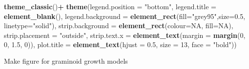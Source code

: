 \documentclass[
]{article}
\newenvironment{Shaded}{\begin{snugshade}}{\end{snugshade}}
\newcommand{\DataTypeTok}[1]{\textcolor[rgb]{0.13,0.29,0.53}{#1}}
\newcommand{\DecValTok}[1]{\textcolor[rgb]{0.00,0.00,0.81}{#1}}
\newcommand{\FloatTok}[1]{\textcolor[rgb]{0.00,0.00,0.81}{#1}}
\newcommand{\KeywordTok}[1]{\textcolor[rgb]{0.13,0.29,0.53}{\textbf{#1}}}
\newcommand{\NormalTok}[1]{#1}
\newcommand{\OperatorTok}[1]{\textcolor[rgb]{0.81,0.36,0.00}{\textbf{#1}}}
\newcommand{\OtherTok}[1]{\textcolor[rgb]{0.56,0.35,0.01}{#1}}
\newcommand{\StringTok}[1]{\textcolor[rgb]{0.31,0.60,0.02}{#1}}
\begin{document}
\begin{Shaded}
\begin{Highlighting}[]
\StringTok{  }\KeywordTok{theme\_classic}\NormalTok{()}\OperatorTok{+}
\StringTok{  }\KeywordTok{theme}\NormalTok{(}\DataTypeTok{legend.position =} \StringTok{"bottom"}\NormalTok{, }\DataTypeTok{legend.title =} \KeywordTok{element\_blank}\NormalTok{(), }\DataTypeTok{legend.background =} \KeywordTok{element\_rect}\NormalTok{(}\DataTypeTok{fill=}\StringTok{"grey95"}\NormalTok{,}\DataTypeTok{size=}\FloatTok{0.5}\NormalTok{, }\DataTypeTok{linetype=}\StringTok{"solid"}\NormalTok{), }\DataTypeTok{strip.background =} \KeywordTok{element\_rect}\NormalTok{(}\DataTypeTok{colour=}\OtherTok{NA}\NormalTok{, }\DataTypeTok{fill=}\OtherTok{NA}\NormalTok{), }\DataTypeTok{strip.placement =} \StringTok{"outside"}\NormalTok{, }\DataTypeTok{strip.text.x =} \KeywordTok{element\_text}\NormalTok{(}\DataTypeTok{margin =} \KeywordTok{margin}\NormalTok{(}\DecValTok{0}\NormalTok{, }\DecValTok{0}\NormalTok{, }\FloatTok{1.5}\NormalTok{, }\DecValTok{0}\NormalTok{)), }\DataTypeTok{plot.title =} \KeywordTok{element\_text}\NormalTok{(}\DataTypeTok{hjust =} \FloatTok{0.5}\NormalTok{, }\DataTypeTok{size =} \DecValTok{13}\NormalTok{, }\DataTypeTok{face =} \StringTok{"bold"}\NormalTok{))}
\end{Highlighting}
\end{Shaded}

Make figure for graminoid growth models
\end{document}
